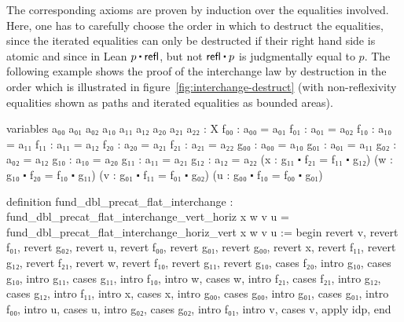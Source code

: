 The corresponding axioms are proven by induction over the equalities involved.
Here, one has to carefully choose the order in which to destruct the equalities,
since the iterated equalities can only be destructed if their right hand side
is atomic and since in Lean $p \ct \refl$, but not $\refl \ct p$ is judgmentally
equal to $p$.
The following example shows the proof of the interchange law by destruction in the
order which is illustrated in
figure~\ref{fig:interchange-destruct} (with
non-reflexivity equalities shown as paths and iterated equalities as bounded
areas).
\begin{leancodebr}
  variables
    {a₀₀ a₀₁ a₀₂ a₁₀ a₁₁ a₁₂ a₂₀ a₂₁ a₂₂ : X}
    {f₀₀ : a₀₀ = a₀₁} {f₀₁ : a₀₁ = a₀₂} {f₁₀ : a₁₀ = a₁₁} {f₁₁ : a₁₁ = a₁₂}
    {f₂₀ : a₂₀ = a₂₁} {f₂₁ : a₂₁ = a₂₂} {g₀₀ : a₀₀ = a₁₀} {g₀₁ : a₀₁ = a₁₁}
    {g₀₂ : a₀₂ = a₁₂} {g₁₀ : a₁₀ = a₂₀} {g₁₁ : a₁₁ = a₂₁} {g₁₂ : a₁₂ = a₂₂}
    (x : g₁₁ ⬝ f₂₁ = f₁₁ ⬝ g₁₂) (w : g₁₀ ⬝ f₂₀ = f₁₀ ⬝ g₁₁)
    (v : g₀₁ ⬝ f₁₁ = f₀₁ ⬝ g₀₂) (u : g₀₀ ⬝ f₁₀ = f₀₀ ⬝ g₀₁)

  definition fund_dbl_precat_flat_interchange :
    fund_dbl_precat_flat_interchange_vert_horiz x w v u
    = fund_dbl_precat_flat_interchange_horiz_vert x w v u :=
  begin
    revert v, revert f₀₁, revert g₀₂,
    revert u, revert f₀₀, revert g₀₁, revert g₀₀,
    revert x, revert f₁₁, revert g₁₂, revert f₂₁,
    revert w, revert f₁₀, revert g₁₁, revert g₁₀,
    cases f₂₀,
    intro g₁₀, cases g₁₀,
    intro g₁₁, cases g₁₁,
    intro f₁₀, intro w, cases w,
    intro f₂₁, cases f₂₁,
    intro g₁₂, cases g₁₂,
    intro f₁₁, intro x, cases x,
    intro g₀₀, cases g₀₀,
    intro g₀₁, cases g₀₁,
    intro f₀₀, intro u, cases u,
    intro g₀₂, cases g₀₂,
    intro f₀₁, intro v, cases v,
    apply idp,
  end
\end{leancodebr}

